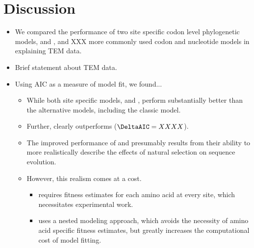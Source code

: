 \documentclass[12pt]{article}
\begin{document}
\section*{Discussion}
\begin{itemize}
\item We compared the performance of two site specific codon level phylogenetic models, \phydms and \selac, and XXX more commonly used codon and nucleotide models in explaining TEM data.
\item Brief statement about \ecoli TEM data.

\item Using AIC as a measure of model fit, we found...
  \begin{itemize}
  \item While both site specific models, \phydms and \selac, perform substantially better than the alternative models, including the classic \gy model.
  \item Further, \selac clearly outperforms \phydms ($\DeltaAIC = XXXX$).
  \item The improved performance of \phydms and \selac presumably results from their ability to more realistically describe the effects of natural selection on sequence evolution.
  \item However, this realism comes at a cost.
    \begin{itemize}
    \item \phydms requires fitness estimates for each amino acid at every site, which necessitates experimental work.
    \item \selac uses a nested modeling approach, which avoids the necessity of amino acid specific fitness estimates, but greatly increases the computational cost of model fitting.
    \end{itemize}
  \end{itemize}


\end{itemize}
\end{document}
